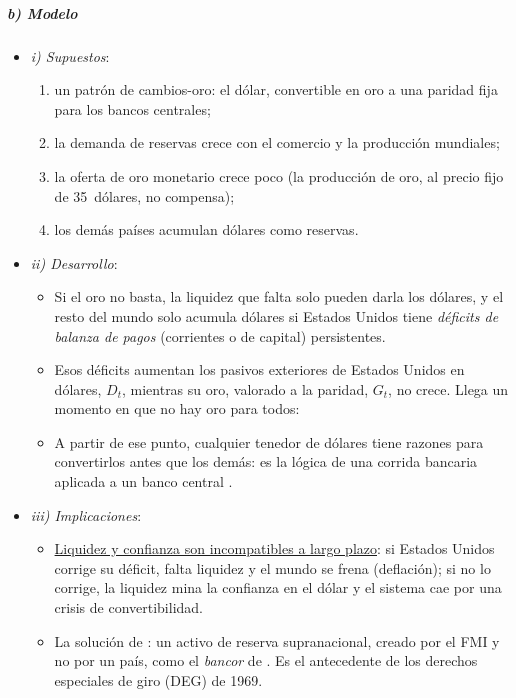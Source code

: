 \documentclass[11pt]{article}
\begin{document}
\subparagraph{b) Modelo}

\begin{itemize}
\item \emph{i) Supuestos}:
  \begin{enumerate}
  \item un patrón de cambios-oro: el dólar, convertible en oro a una paridad fija para los bancos centrales;
  \item la demanda de reservas crece con el comercio y la producción mundiales;
  \item la oferta de oro monetario crece poco (la producción de oro, al precio fijo de 35~dólares, no compensa);
  \item los demás países acumulan dólares como reservas.
  \end{enumerate}
\item \emph{ii) Desarrollo}:
  \begin{itemize}
  \item Si el oro no basta, la liquidez que falta solo pueden darla los dólares, y el resto del mundo solo acumula dólares si Estados Unidos tiene \emph{déficits de balanza de pagos} (corrientes o de capital) persistentes.
  \item Esos déficits aumentan los pasivos exteriores de Estados Unidos en dólares, $D_t$, mientras su oro, valorado a la paridad, $G_t$, no crece. Llega un momento en que no hay oro para todos:
  \item A partir de ese punto, cualquier tenedor de dólares tiene razones para convertirlos antes que los demás: es la lógica de una corrida bancaria aplicada a un banco central .
  \end{itemize}
\item \emph{iii) Implicaciones}:
  \begin{itemize}
  \item \uline{Liquidez y confianza son incompatibles a largo plazo}: si Estados Unidos corrige su déficit, falta liquidez y el mundo se frena (deflación); si no lo corrige, la liquidez mina la confianza en el dólar y el sistema cae por una crisis de convertibilidad.
  \item La solución de : un activo de reserva supranacional, creado por el FMI y no por un país, como el \emph{bancor} de . Es el antecedente de los derechos especiales de giro (DEG) de 1969.
  \end{itemize}
\end{itemize}
\end{document}
